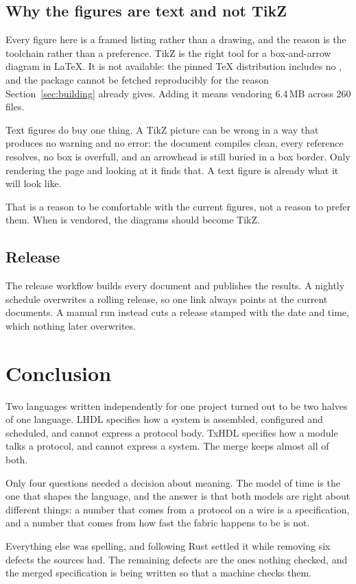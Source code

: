 \subsection{Why the figures are text and not TikZ}

Every figure here is a framed listing rather than a drawing, and the reason
is the toolchain rather than a preference. TikZ is the right tool for a
box-and-arrow diagram in LaTeX. It is not available: the pinned TeX
distribution includes no , and the package cannot be fetched
reproducibly for the reason Section~\ref{sec:building} already gives. Adding
it means vendoring 6.4\,MB across 260 files.

Text figures do buy one thing. A TikZ picture can be wrong in a way that
produces no warning and no error: the document compiles clean, every
reference resolves, no box is overfull, and an arrowhead is still buried in
a box border. Only rendering the page and looking at it finds that. A text
figure is already what it will look like.

That is a reason to be comfortable with the current figures, not a reason to
prefer them. When  is vendored, the diagrams should become TikZ.

\subsection{Release}

The release workflow builds every document and publishes the results. A
nightly schedule overwrites a rolling release, so one link always points at
the current documents. A manual run instead cuts a release stamped with the
date and time, which nothing later overwrites.

\section{Conclusion}
\label{sec:conclusion}

Two languages written independently for one project turned out to be two
halves of one language. LHDL specifies how a system is assembled,
configured and scheduled, and cannot express a protocol body. TxHDL
specifies how a module talks a protocol, and cannot express a system. The
merge keeps almost all of both.

Only four questions needed a decision about meaning. The model of time is
the one that shapes the language, and the answer is that both models are
right about different things: a number that comes from a protocol on a wire
is a specification, and a number that comes from how fast the fabric
happens to be is not.

Everything else was spelling, and following Rust settled it while removing
six defects the sources had. The remaining defects are the ones nothing
checked, and the merged specification is being written so that a machine
checks them.

